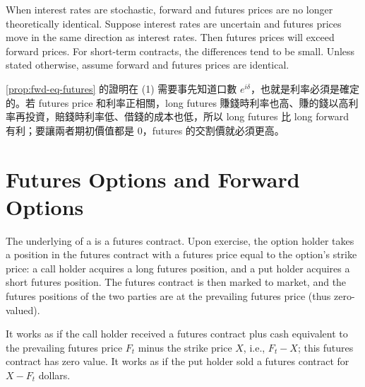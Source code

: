 When interest rates are stochastic, forward and futures prices are no longer theoretically identical.
Suppose interest rates are uncertain and futures prices move in the same direction as interest rates.
Then futures prices will exceed forward prices.
For short-term contracts, the differences tend to be small.
Unless stated otherwise, assume forward and futures prices are identical.

\suppstart
{}

\begin{intuition}
	\autoref{prop:fwd-eq-futures} 的證明在 (1) 需要事先知道口數 $e^{i\delta}$，也就是利率必須是確定的。若 futures price 和利率正相關，long futures 賺錢時利率也高、賺的錢以高利率再投資，賠錢時利率低、借錢的成本也低，所以 long futures 比 long forward 有利；要讓兩者期初價值都是 $0$，futures 的交割價就必須更高。
\end{intuition}
\suppend

\section{Futures Options and Forward Options}
\label{sec:futures-options}


The underlying of a  is a futures contract.
Upon exercise, the option holder takes a position in the futures contract with a futures price equal to the option's strike price:
a call holder acquires a long futures position, and a put holder acquires a short futures position.
The futures contract is then marked to market, and the futures positions of the two parties are at the prevailing futures price (thus zero-valued).

It works as if the call holder received a futures contract plus cash equivalent to the prevailing futures price $F_{t}$ minus the strike price $X$, i.e., $F_{t}-X$; this futures contract has zero value.
It works as if the put holder sold a futures contract for $X-F_{t}$ dollars.

\suppstart
{}
\suppend

